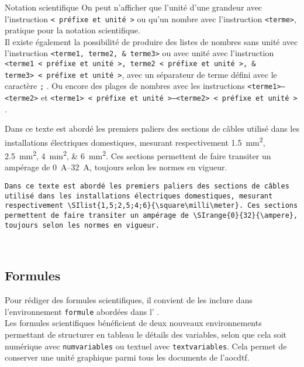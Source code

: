 \documentclass[a4paper, 11pt, twoside, fleqn]{memoir}
\begin{document}
\begin{exemple}{Notation scientifique}{}
On peut n'afficher que l'unité d'une grandeur avec l'instruction \texttt{\si{<préfixe et unité>}} ou qu'un nombre avec l'instruction \texttt{\num{<terme>}}, pratique pour la notation scientifique.\\
Il existe également la possibilité de produire des listes de nombres sans unité avec l'instruction \texttt{\numlist{<terme1;terme2;terme3>}} ou avec unité avec l'instruction \texttt{\SIlist{<terme1;terme2;terme3>}{<préfixe et unité>}}, avec un séparateur de terme défini avec le caractère \texttt{;} . Ou encore des plages de nombres avec les instructions \texttt{\numrange{<terme1>}{<terme2>}} et \texttt{\SIrange{<terme1>}{<terme2>}{<préfixe et unité>}} .\\

\begin{minipage}[t]{0.49\linewidth}
Dans ce texte est abordé les premiers paliers des sections de câbles utilisé dans les installations électriques domestiques, mesurant respectivement \SIlist{1,5;2,5;4;6}{\square\milli\meter}. Ces sections permettent de faire transiter un ampérage de \SIrange{0}{32}{\ampere}, toujours selon les normes en vigueur.
\end{minipage}
\hfill
\begin{minipage}[t]{0.49\linewidth}
\begin{verbatim}
Dans ce texte est abordé les premiers paliers des sections de câbles utilisé dans les installations électriques domestiques, mesurant respectivement \SIlist{1,5;2,5;4;6}{\square\milli\meter}. Ces sections permettent de faire transiter un ampérage de \SIrange{0}{32}{\ampere}, toujours selon les normes en vigueur.
\end{verbatim}
\end{minipage}\\

\end{exemple}
	 
	 \subsection{Formules}

Pour rédiger des formules scientifiques, il convient de les inclure dans l'environnement \texttt{formule} abordées dans l' .\\
Les formules scientifiques bénéficient de deux nouveaux environnements permettant de structurer en tableau le détails des variables, selon que cela soit numérique avec \texttt{numvariables} ou textuel avec \texttt{textvariables}. Cela permet de conserver une unité graphique parmi tous les documents de l'\gls{aocdtf}.
\end{document}
